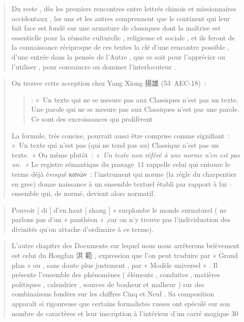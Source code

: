  \begin{quote}

Du reste , dès les premiers rencontres entre lettrés chinois et
missionnaires occidentaux , les uns et les autres comprennent que le
continent qui leur fait face est fondé sur une armature de classiques
dont la maîtrise est essentielle pour la réussite culturelle ,
religieuse et sociale , et ils feront de la connaissance réciproque de
ces textes la clé d'une rencontre possible , d'une entrée dans la pensée
de l'Autre , que ce soit pour l'apprécier ou l'utiliser , pour
convaincre ou dominer l'interlocuteur .

\end{quote}  \begin{quote}
On trouve cette acception chez Yang Xiong 揚雄 (53 AEC-18) :

 
 \begin{quote}
     : « Un texte qui ne se mesure pas aux Classiques n’est pas un texte. Une parole qui ne se mesure pas aux Classiques n’est pas une parole. Ce sont des excroissances qui prolifèrent  
 \end{quote}
La formule, très concise, pourrait aussi être comprise comme signifiant : « Un texte qui n’est pas (qui ne tend pas au) Classique n’est pas un texte. » Ou même plutôt : \textit{« Un texte non référé à une norme n’en est pas un. »} Le registre sémantique du passage 11 rappelle celui qui entoure le terme déjà évoqué κανών : l’instrument qui norme (la règle du charpentier en grec) donne naissance à un ensemble textuel établi par rapport à lui – ensemble qui, de normé, devient alors normatif.
 
\end{quote}  \begin{quote}

Pouvoir {[} di {]} d'en haut {[} shang {]} » surplombe le monde
surnaturel ( ne parlons pas d'un « panthéon » ,car on n’y trouve pas l’individuation des divinités qu’on attache d’ordinaire à ce terme).

 

\end{quote}  \begin{quote}

L'autre chapitre des Documents sur lequel nous nous arrêterons
brièvement est celui du Hongfan 洪 範 , expression que l'on peut
traduire par « Grand plan » ou , sans doute plus justement , par «
Modèle universel » . Il présente l'ensemble des phénomènes ( éléments ,
conduites , matières politiques , calendrier , sources de bonheur et
malheur ) sur des combinaisons fondées sur les chiffres Cinq et Neuf .
Sa composition apparaît si rigoureuse que certains formalistes russes
ont spéculé sur son nombre de caractères et leur inscription à
l'intérieur d'un carré magique 30

\end{quote} 

